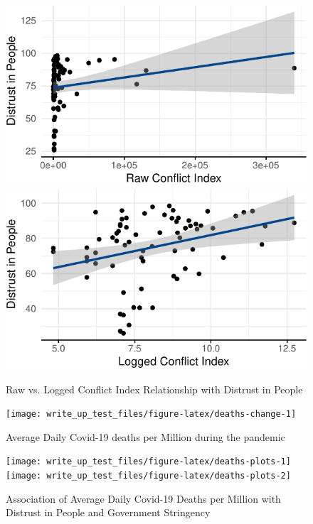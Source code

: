 \documentclass[
  11pt,
]{article}
\begin{document}
\begin{figure}
\includegraphics[width=0.48\linewidth]{write_up_test_files/figure-latex/conflict-log-1} \includegraphics[width=0.48\linewidth]{write_up_test_files/figure-latex/conflict-log-2} \caption{Raw vs. Logged Conflict Index Relationship with Distrust in People}\label{fig:conflict-log}
\end{figure}

\begin{figure}
\texttt{[image: write\_up\_test\_files/figure-latex/deaths-change-1]} \caption{Average Daily Covid-19 deaths per Million during the pandemic}\label{fig:deaths-change}
\end{figure}

\begin{figure}
\texttt{[image: write\_up\_test\_files/figure-latex/deaths-plots-1]} \texttt{[image: write\_up\_test\_files/figure-latex/deaths-plots-2]} \caption{Association of Average Daily Covid-19 Deaths per Million with Distrust in People and Government Stringency}\label{fig:deaths-plots}
\end{figure}
\end{document}
